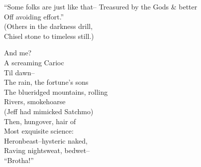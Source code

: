 ``Some folks are just like that--
Treasured by the Gods \& better \\
Off avoiding effort.'' \\
(Others in the darkness drill, \\
Chisel stone to timeless still.)

And me? \\
A screaming Carioc \\
Til dawn-- \\
The rain, the fortune's sons \\
The blueridged mountains, rolling \\
Rivers, smokehoarse \\
(Jeff had mimicked Satchmo) \\
Then, hungover, hair of \\
Most exquisite science: \\
Heronbeast--hysteric naked, \\
Raving nightsweat, bedwet-- \\
``Brotha!''

